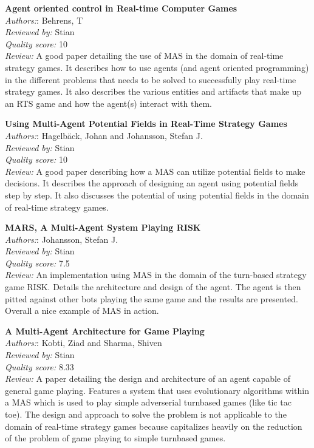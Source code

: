 \textbf{Agent oriented control in Real-time Computer Games}\\
\textit{Authors:}: Behrens, T\\
\textit{Reviewed by:} Stian\\
\textit{Quality score:} 10\\
\textit{Review:} A good paper detailing the use of MAS in the domain of real-time strategy games. It describes how to use agents (and agent oriented programming) in the different problems that needs to be solved to successfully play real-time strategy games. It also describes the various entities and artifacts that make up an RTS game and how the agent(s) interact with them. 

\textbf{Using Multi-Agent Potential Fields in Real-Time Strategy Games}\\
\textit{Authors:}: Hagelb\"{a}ck, Johan and Johansson, Stefan J.\\
\textit{Reviewed by:} Stian\\
\textit{Quality score:} 10\\
\textit{Review:} A good paper describing how a MAS can utilize potential fields to make decisions. It describes the approach of designing an agent using potential fields step by step. It also discusses the potential of using potential fields in the domain of real-time strategy games.

\textbf{MARS, A Multi-Agent System Playing RISK}\\
\textit{Authors:}: Johansson, Stefan J.\\
\textit{Reviewed by:} Stian\\
\textit{Quality score:} 7.5\\
\textit{Review:} An implementation using MAS in the domain of the turn-based strategy game RISK. Details the architecture and design of the agent. The agent is then pitted against other bots playing the same game and the results are presented. Overall a nice example of MAS in action. 

\textbf{A Multi-Agent Architecture for Game Playing}\\
\textit{Authors:}: Kobti, Ziad and Sharma, Shiven\\
\textit{Reviewed by:} Stian\\
\textit{Quality score:} 8.33\\
\textit{Review:} A paper detailing the design and architecture of an agent capable of general game playing. Features a system that uses evolutionary algorithms within a MAS which is used to play simple adverserial turnbased games (like tic tac toe). The design and approach to solve the problem is not applicable to the domain of real-time strategy games because capitalizes heavily on the reduction of the problem of game playing to simple turnbased games.

